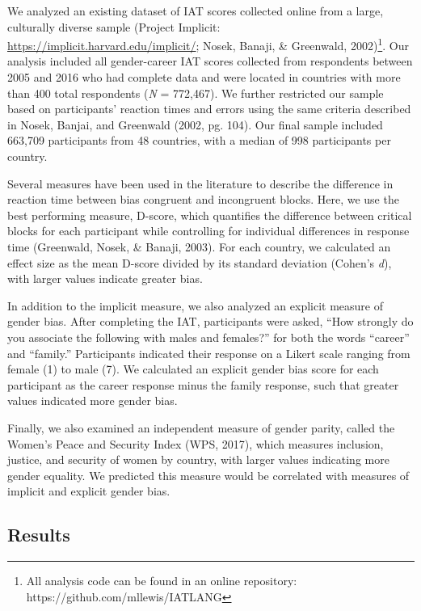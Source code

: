\documentclass[10pt, letterpaper]{article}
\begin{document}
We analyzed an existing dataset of IAT scores collected online from a
large, culturally diverse sample (Project Implicit:
\url{https://implicit.harvard.edu/implicit/}; Nosek, Banaji, \&
Greenwald,
2002)\footnote{All analysis code can be found in an online repository: https://github.com/mllewis/IATLANG}.
Our analysis included all gender-career IAT scores collected from
respondents between 2005 and 2016 who had complete data and were located
in countries with more than 400 total respondents (\emph{N} = 772,467).
We further restricted our sample based on participants' reaction times
and errors using the same criteria described in Nosek, Banjai, and
Greenwald (2002, pg. 104). Our final sample included 663,709
participants from 48 countries, with a median of 998 participants per
country.

Several measures have been used in the literature to describe the
difference in reaction time between bias congruent and incongruent
blocks. Here, we use the best performing measure, D-score, which
quantifies the difference between critical blocks for each participant
while controlling for individual differences in response time
(Greenwald, Nosek, \& Banaji, 2003). For each country, we calculated an
effect size as the mean D-score divided by its standard deviation
(Cohen's \emph{d}), with larger values indicate greater bias.

In addition to the implicit measure, we also analyzed an explicit
measure of gender bias. After completing the IAT, participants were
asked, ``How strongly do you associate the following with males and
females?'' for both the words ``career'' and ``family.'' Participants
indicated their response on a Likert scale ranging from female (1) to
male (7). We calculated an explicit gender bias score for each
participant as the career response minus the family response, such that
greater values indicated more gender bias.

Finally, we also examined an independent measure of gender parity,
called the Women's Peace and Security Index (WPS, 2017), which measures
inclusion, justice, and security of women by country, with larger values
indicating more gender equality. We predicted this measure would be
correlated with measures of implicit and explicit gender bias.

\subsection{Results}\label{results}
\end{document}
